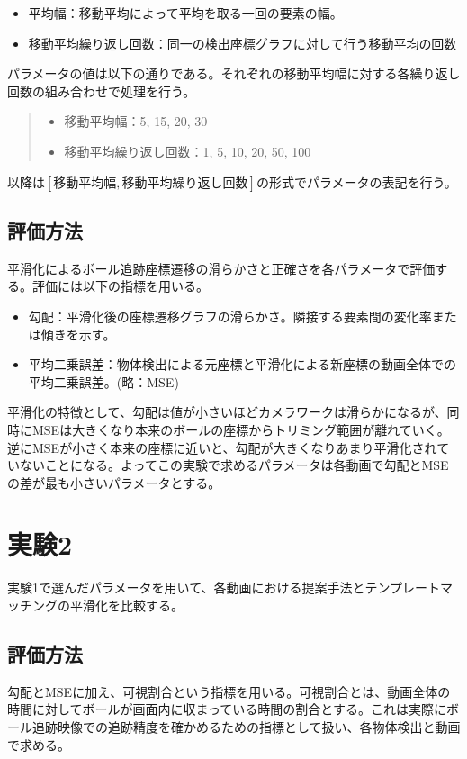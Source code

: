 \documentclass[11pt,a4j]{jreport}
\begin{document}
\begin{itemize}
    \item 平均幅：移動平均によって平均を取る一回の要素の幅。
    \item 移動平均繰り返し回数：同一の検出座標グラフに対して行う移動平均の回数
\end{itemize}

パラメータの値は以下の通りである。それぞれの移動平均幅に対する各繰り返し回数の組み合わせで処理を行う。
\begin{quote}
    \begin{itemize}
        \item 移動平均幅：5, 15, 20, 30
        \item 移動平均繰り返し回数：1, 5, 10, 20, 50, 100
    \end{itemize}
\end{quote}

以降は$[\text{移動平均幅}, \text{移動平均繰り返し回数}]$の形式でパラメータの表記を行う。

\subsection{評価方法}
平滑化によるボール追跡座標遷移の滑らかさと正確さを各パラメータで評価する。評価には以下の指標を用いる。

\begin{itemize}
    \item 勾配：平滑化後の座標遷移グラフの滑らかさ。隣接する要素間の変化率または傾きを示す。
    \item 平均二乗誤差：物体検出による元座標と平滑化による新座標の動画全体での平均二乗誤差。(略：MSE)
\end{itemize}
平滑化の特徴として、勾配は値が小さいほどカメラワークは滑らかになるが、同時にMSEは大きくなり本来のボールの座標からトリミング範囲が離れていく。逆にMSEが小さく本来の座標に近いと、勾配が大きくなりあまり平滑化されていないことになる。よってこの実験で求めるパラメータは各動画で勾配とMSEの差が最も小さいパラメータとする。


\section{実験2}
実験1で選んだパラメータを用いて、各動画における提案手法とテンプレートマッチングの平滑化を比較する。

\subsection{評価方法}
勾配とMSEに加え、可視割合という指標を用いる。可視割合とは、動画全体の時間に対してボールが画面内に収まっている時間の割合とする。これは実際にボール追跡映像での追跡精度を確かめるための指標として扱い、各物体検出と動画で求める。
\end{document}
